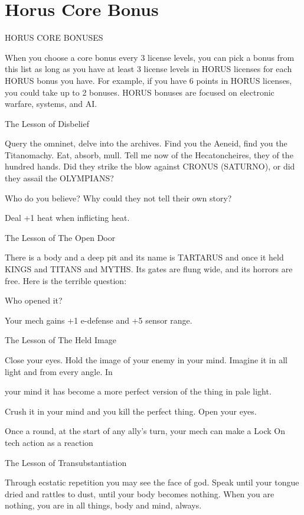 \section{Horus Core Bonus}

                                      HORUS CORE BONUSES  

When you choose a core bonus every 3 license levels, you can pick a bonus from this list as long  
as you have at least 3 license levels in HORUS licenses for each HORUS bonus you have. For  
example, if you have 6 points in HORUS licenses, you could take up to 2 bonuses. HORUS  
bonuses are focused on electronic warfare, systems, and AI.
 

The Lesson of Disbelief  

Query the omninet, delve into the archives. Find you the Aeneid, find you the Titanomachy. Eat, absorb,  
mull. Tell me now of the Hecatoncheires, they of the hundred hands. Did they strike the blow against  
CRONUS (SATURNO), or did they assail the OLYMPIANS?   

Who do you believe? Why could they not tell their own story?   

Deal +1 heat when inflicting heat.
 

The Lesson of The Open Door   

There is a body and a deep pit and its name is TARTARUS and once it held KINGS and TITANS and  
MYTHS. Its gates are flung wide, and its horrors are free. Here is the terrible question:
 
Who opened it?   

Your mech gains +1 e-defense and +5 sensor range.
 

The Lesson of The Held Image  

Close your eyes. Hold the image of your enemy in your mind. Imagine it in all light and from every angle. In  

your mind it has become a more perfect version of the thing in pale light. 
 
Crush it in your mind and you kill the perfect thing. Open your eyes.    

Once a round, at the start of any ally’s turn, your mech can make a Lock On tech action as a  
reaction
 

The Lesson of Transubstantiation  

Through ecstatic repetition you may see the face of god. Speak until your tongue dried and rattles to dust,  
until your body becomes nothing. When you are nothing, you are in all things, body and mind, always.    

